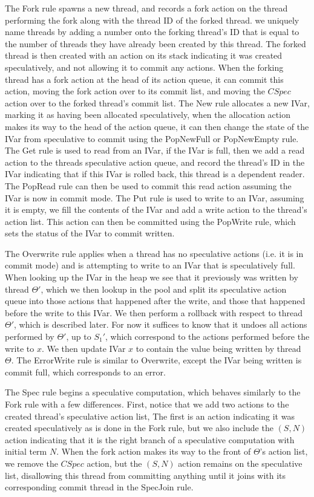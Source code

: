 The Fork rule spawns a new thread, and records a fork action on the thread performing the fork along with the thread ID of the forked thread.  we uniquely name threads by adding a number onto the forking thread's ID that is equal to the number of threads they have already been created by this thread.  The forked thread is then created with an action on its stack indicating it was created speculatively, and not allowing it to commit any actions.  When the forking thread has a fork action at the head of its action queue, it can commit this action, moving the fork action over to its commit list, and moving the $CSpec$ action over to the forked thread's commit list.  The New rule allocates a new IVar, marking it as having been allocated speculatively, when the allocation action makes its way to the head of the action queue, it can then change the state of the IVar from speculative to commit using the PopNewFull or PopNewEmpty rule.  The Get rule is used to read from an IVar, if the IVar is full, then we add a read action to the threads speculative action queue, and record the thread's ID in the IVar indicating that if this IVar is rolled back, this thread is a dependent reader.  The PopRead rule can then be used to commit this read action assuming the IVar is now in commit mode.  The Put rule is used to write to an IVar, assuming it is empty, we fill the contents of the IVar and add a write action to the thread's action list.  This action can then be committed using the PopWrite rule, which sets the status of the IVar to commit written. 

The Overwrite rule applies when a thread has no speculative actions (i.e. it is in commit mode) and is attempting to write to an IVar that is speculatively full.  When looking up the IVar in the heap we see that it previously was written by thread $\Theta'$, which we then lookup in the pool and split its speculative action queue into those actions that happened after the write, and those that happened before the write to this IVar.  We then perform a rollback with respect to thread $\Theta'$, which is described later.  For now it suffices to know that it undoes all actions performed by $\Theta'$, up to $S_1'$, which correspond to the actions performed before the write to $x$. We then update IVar $x$ to contain the value being written by thread $\Theta$.  The ErrorWrite rule is similar to Overwrite, except the IVar being written is commit full, which corresponds to an error.  

The Spec rule begins a speculative computation, which behaves similarly to the Fork rule with a few differences.  First, notice that we add two actions to the created thread's speculative action list, The first is an action indicating it was created speculatively as is done in the Fork rule, but we also include the $(S, N)$ action indicating that it is the right branch of a speculative computation with initial term $N$.  When the fork action makes its way to the front of $\Theta$'s action list, we remove the $CSpec$ action, but the $(S, N)$ action remains on the speculative list, disallowing this thread from committing anything until it joins with its corresponding commit thread in the SpecJoin rule.  

